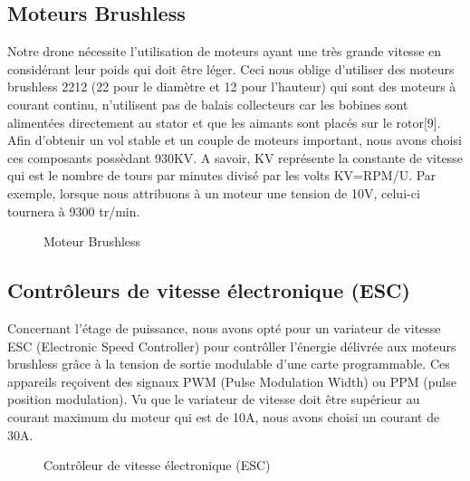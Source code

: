 \documentclass[a4paper,12pt]{book}
\begin{document}
	\subsection{Moteurs Brushless}
Notre drone nécessite l'utilisation de moteurs ayant une très grande vitesse en considérant leur poids qui doit être léger. Ceci nous oblige d'utiliser des moteurs brushless 2212 (22 pour le diamètre et 12 pour l'hauteur) qui sont des moteurs à courant continu, n’utilisent pas de balais collecteurs car les bobines sont alimentées directement au stator et que les aimants sont placés sur le rotor[9]. Afin d'obtenir un vol stable et un couple de moteurs important, nous avons choisi ces composants possèdant 930KV. A savoir, KV représente la constante de vitesse qui est le nombre de tours par minutes divisé par les volts KV=RPM/U. Par exemple, lorsque nous attribuons à un moteur une tension de 10V, celui-ci tournera à 9300 tr/min. 
	\begin{figure} [h]
		\begin{center}
			\centering
		\end{center}
		\caption{Moteur Brushless}
	\end{figure}
	\subsection{Contrôleurs de vitesse électronique (ESC)}
Concernant l'étage de puissance, nous avons opté pour un variateur de vitesse ESC (Electronic Speed Controller) pour contrôller l'énergie délivrée aux moteurs brushless  grâce à la tension de sortie modulable d’une carte programmable.  Ces appareils reçoivent des signaux PWM (Pulse Modulation Width) ou PPM (pulse position modulation). Vu que le variateur de vitesse doit être supérieur au courant maximum du moteur qui est de 10A, nous avons choisi un courant de 30A. 
	\par
	\begin{figure} [h]
		\begin{center}
			\centering
		\end{center}
		\caption{Contrôleur de vitesse électronique (ESC)}
	\end{figure}
\newpage
\end{document}
